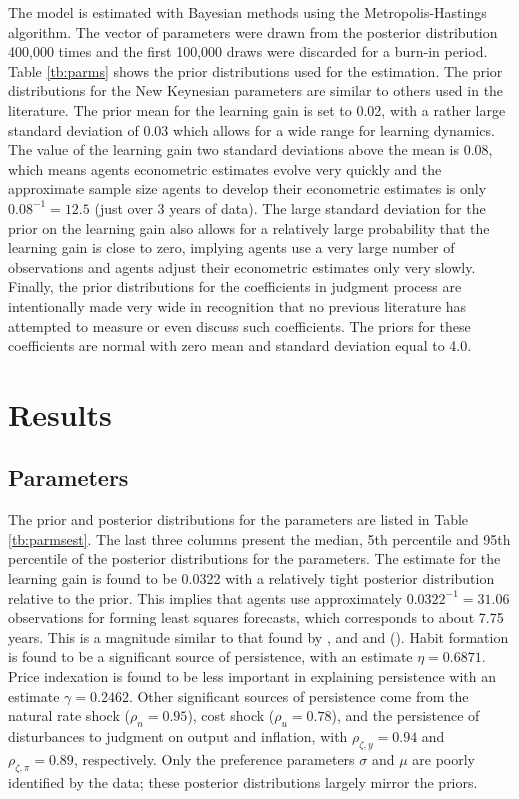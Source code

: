 \documentclass[12pt]{article}
\newcommand{\citee}[1]{\citet{#1}}
\begin{document}
{The model is estimated with Bayesian methods using the Metropolis-Hastings algorithm.  The vector of parameters were drawn from the posterior distribution 400,000 times and the first 100,000 draws were discarded for a burn-in period.  Table \ref{tb:parms} shows the prior distributions used for the estimation.  The prior distributions for the New Keynesian parameters are similar to others used in the literature.  The prior mean for the learning gain is set to 0.02, with a rather large standard deviation of 0.03 which allows for a wide range for learning dynamics.  The value of the learning gain two standard deviations above the mean is 0.08, which means agents econometric estimates evolve very quickly and the approximate sample size agents to develop their econometric estimates is only $0.08^{-1} = 12.5$ (just over 3 years of data).  The large standard deviation for the prior on the learning gain also allows for a relatively large probability that the learning gain is close to zero, implying agents use a very large number of observations and agents adjust their econometric estimates only very slowly.  Finally, the prior distributions for the coefficients in judgment process are intentionally made very wide in recognition that no previous literature has attempted to measure or even discuss such coefficients.  The priors for these coefficients are normal with zero mean and standard deviation equal to 4.0.   

\section{Results}
\subsection{Parameters}
The prior and posterior distributions for the parameters are listed in Table \ref{tb:parmsest}.  The last three columns present the median, 5th percentile and 95th percentile of the posterior distributions for the parameters.  The estimate for the learning gain is found to be 0.0322 with a relatively tight posterior distribution relative to the prior.  This implies that agents use approximately $0.0322^{-1} = 31.06$ observations for forming least squares forecasts, which corresponds to about 7.75 years.  This is a magnitude similar to that found by \citee{milani2007}, and \citee{slobodyan_wouters_2007} and (\citeyear{slobodyan_wouters_2008}).  Habit formation is found to be a significant source of persistence, with an estimate $\eta=0.6871$.  Price indexation is found to be less important in explaining persistence with an estimate $\gamma=0.2462$.  Other significant sources of persistence come from the natural rate shock ($\rho_n = 0.95$), cost shock ($\rho_u=0.78$), and the persistence of disturbances to judgment on output and inflation, with $\rho_{\zeta,y}=0.94$ and $\rho_{\zeta,\pi}=0.89$, respectively.  Only the preference parameters $\sigma$ and $\mu$ are poorly identified by the data; these posterior distributions largely mirror the priors. 

}
\end{document}
